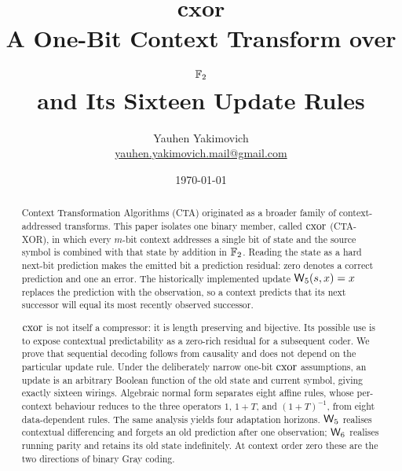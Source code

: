 \documentclass[11pt,a4paper]{article}
\title{%
  \texorpdfstring{{\Huge\bfseries$\mathbf{cxor}$}}{cxor}\\[6pt]
  {\large A One-Bit Context Transform over \texorpdfstring{$\mathbb{F}_2$}{F2}}\\[-5pt]
  {\large and Its Sixteen Update Rules}}
\author{Yauhen Yakimovich\\
        \small\href{mailto:yauhen.yakimovich.mail@gmail.com}{yauhen.yakimovich.mail@gmail.com}}
\date{\today}
\begin{document}
\maketitle

\begin{abstract}
Context Transformation Algorithms (CTA) originated as a broader family of context-addressed
transforms.  This paper isolates one binary member, called $\mathrm{cxor}$ (CTA-XOR), in which every
$m$-bit context addresses a single bit of state and the source symbol is combined with that state
by addition in $\mathbb{F}_2$.  Reading the state as a hard next-bit prediction makes the emitted bit a
prediction residual: zero denotes a correct prediction and one an error.  The historically
implemented update $\mathsf{W}_{5}(s,x)=x$ replaces the prediction with the observation, so a context
predicts that its next successor will equal its most recently observed successor.

$\mathrm{cxor}$ is not itself a compressor: it is length preserving and bijective.  Its possible use is
to expose contextual predictability as a zero-rich residual for a subsequent coder.  We prove
that sequential decoding follows from causality and does not depend on the particular update
rule.  Under the deliberately narrow one-bit $\mathrm{cxor}$ assumptions, an update is an arbitrary
Boolean function of the old state and current symbol, giving exactly sixteen wirings.  Algebraic
normal form separates eight affine rules, whose per-context behaviour reduces to the three
operators $1$, $1+T$, and $(1+T)^{-1}$, from eight data-dependent rules.  The same analysis yields
four adaptation horizons.  $\mathsf{W}_{5}$ realises contextual differencing and forgets an old prediction
after one observation; $\mathsf{W}_{6}$ realises running parity and retains its old state indefinitely.  At
context order zero these are the two directions of binary Gray coding.
\end{abstract}










\appendix




\printbibliography
\end{document}
